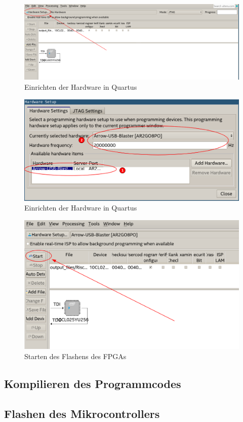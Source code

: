     \begin{figure}[H]
        \centering
        \includegraphics[scale=0.6]{img/quartus_programmer_select_hardware.png}
        \caption{Einrichten der Hardware in Quartus}
        \label{fig:quartus_programmer_window}
    \end{figure}

    \begin{figure}[H]
        \centering
        \includegraphics[scale=0.6]{img/quartus_programmer_select_hardware2.png}
        \caption{Einrichten der Hardware in Quartus}
        \label{fig:quartus_programmer_select_hardware}
    \end{figure}

    \begin{figure}[H]
        \centering
        \includegraphics[scale=0.6]{img/quartus_programmer_start.png}
        \caption{Starten des Flashens des FPGAs}
        \label{fig:quartus_programmer_start}
    \end{figure}


    \subsection{Kompilieren des Programmcodes}
    \subsection{Flashen des Mikrocontrollers}

